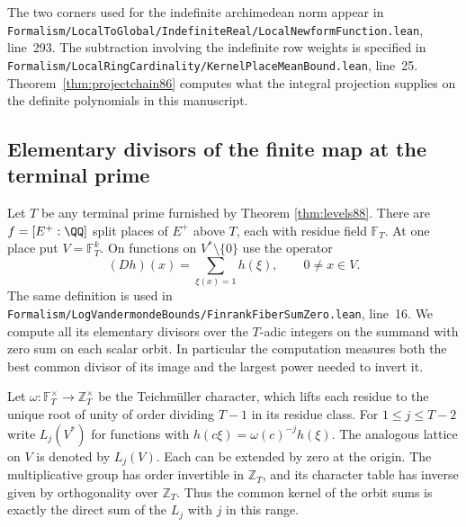 \documentclass[a4paper,11pt]{article}
\theoremstyle{definition}
\theoremstyle{remark}
\newcommand{\ZZ}{\mathbb Z}\newcommand{\ord}{\operatorname{ord}}
\newcommand{\srcloc}[2]{{\small\nolinkurl{#1.lean}}, line~#2}
\numberwithin{equation}{section}
\begin{document}
The two corners used for the indefinite archimedean norm appear in
\srcloc{Formalism/LocalToGlobal/IndefiniteReal/LocalNewformFunction}{293}.
The subtraction involving the indefinite row weights is specified in
\srcloc{Formalism/LocalRingCardinality/KernelPlaceMeanBound}{25}.
Theorem~\ref{thm:projectchain86} computes what the integral
projection supplies on the definite polynomials in this manuscript.

\subsection{Elementary divisors of the finite map at the terminal prime}\label{nav:VI-06}
\label{sec:fourier89}

Let \(T\) be any terminal prime furnished by
Theorem \ref{thm:levels88}.
There are \(f=[E^+:\QQ]\) split places of \(E^+\) above \(T\),
each with residue field \(\mathbb F_T\). At one place put
\(V=\mathbb F_T^k\). On functions on \(V^*\setminus\{0\}\)
use the operator
\begin{equation}
       (Dh)(x)=\sum_{\xi(x)=1}h(\xi),\qquad 0\ne x\in V .
                                                        \label{eq:inc89}
\end{equation}
The same definition is used in
\srcloc{Formalism/LogVandermondeBounds/FinrankFiberSumZero}{16}.
We compute all its elementary divisors over the \(T\)-adic integers
on the summand with zero sum on each scalar orbit. In particular
the computation measures both the best common divisor of its image
and the largest power needed to invert it.

Let \(\omega:\mathbb F_T^\times\longrightarrow\ZZ_T^\times\)
be the Teichm\"uller character, which lifts each residue to the
unique root of unity of order dividing \(T-1\) in its residue
class. For \(1\le j\le T-2\) write \(L_j(V^*)\) for functions
with \(h(c\xi)=\omega(c)^{-j}h(\xi)\). The analogous lattice on
\(V\) is denoted by \(L_j(V)\). Each can be extended by zero at
the origin. The multiplicative group has order invertible in
\(\ZZ_T\), and its character table has inverse given by
orthogonality over \(\ZZ_T\). Thus the common kernel of the
orbit sums is exactly the direct sum of the \(L_j\) with \(j\)
in this range.
\end{document}
